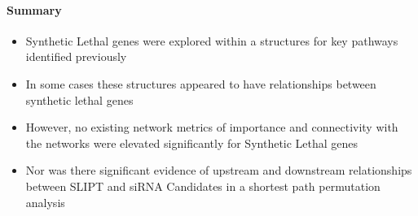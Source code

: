 \paragraph{Summary}

  \begin{itemize}
   \item Synthetic Lethal genes were explored within a  structures for key \glspl{pathway} identified previously 
   
   \bigskip
   
   \item In some cases these  structures appeared to have relationships between \gls{synthetic lethal} genes  
   
   \bigskip
   
   \item However, no existing network metrics of importance and connectivity with the networks were elevated significantly for Synthetic Lethal genes
   
   \bigskip
   
   \item Nor was there significant evidence of upstream and downstream relationships between SLIPT and \gls{siRNA} Candidates in a \gls{shortest path} permutation analysis
  \end{itemize}
  
\clearpage
\fi